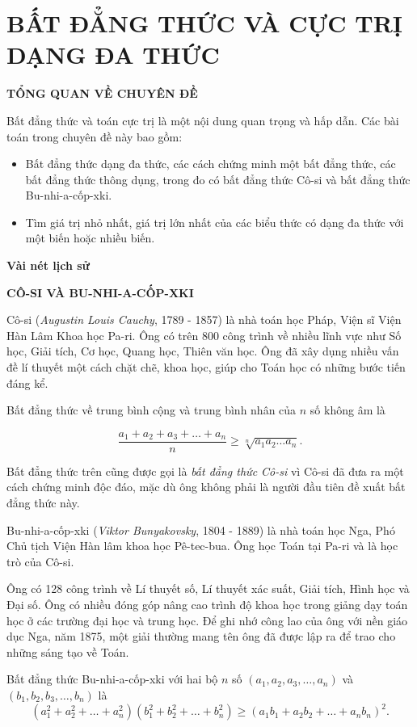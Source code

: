 
\section{BẤT ĐẲNG THỨC VÀ CỰC TRỊ DẠNG ĐA THỨC}

\begin{center}
 \large \textbf{TỔNG QUAN VỀ CHUYÊN ĐỀ}
\end{center}
Bất đẳng thức và toán cực trị là một nội dung quan trọng và hấp dẫn. Các bài toán trong chuyên đề này bao gồm:
\begin{itemize}
	\item Bất đẳng thức dạng đa thức, các cách chứng minh một bất đẳng thức, các bất đẳng thức thông dụng, trong đo có bất đẳng thức Cô-si và bất đẳng thức Bu-nhi-a-cốp-xki.
	\item Tìm giá trị nhỏ nhất, giá trị lớn nhất của các biểu thức có dạng đa thức với một biến hoặc nhiều biến.
\end{itemize}
\textbf{Vài nét lịch sử}
\begin{center}
	\textbf{CÔ-SI VÀ BU-NHI-A-CỐP-XKI}
\end{center}
Cô-si (\textit{Augustin Louis Cauchy}, 1789 - 1857) là nhà toán học Pháp, Viện sĩ Viện Hàn Lâm  Khoa học Pa-ri. Ông có trên 800 công trình về nhiều lĩnh vực như Số học, Giải tích, Cơ học, Quang học, Thiên văn học. Ông đã xây dụng nhiều vấn đề lí thuyết một cách chặt chẽ, khoa học, giúp cho Toán học có những bước tiến đáng kể.\medskip

Bất đẳng thức về trung bình cộng và trung bình nhân của $n$ số không âm là 

$$\dfrac{a_1+a_2+a_3+\ldots+a_n}{n}\geq\sqrt[n]{a_1a_2\ldots a_n}.$$

Bất đẳng thức trên cũng được gọi là \textit{bất đẳng thức Cô-si} vì Cô-si đã đưa ra một cách chứng minh độc đáo, mặc dù ông không phải là người đầu tiên đề xuất bất đẳng thức này.\medskip

Bu-nhi-a-cốp-xki (\textit{Viktor Bunyakovsky}, 1804 - 1889) là nhà toán học Nga, Phó Chủ tịch Viện Hàn lâm khoa học Pê-tec-bua. Ông học Toán tại Pa-ri và là học trò của Cô-si.\medskip

Ông có 128 công trình về Lí thuyết số, Lí thuyết xác suất, Giải tích, Hình học và Đại số. Ông có nhiều đóng góp nâng cao trình độ khoa học trong giảng dạy toán học ở các trường đại học và trung học. Để ghi nhớ công lao của ông với nền giáo dục Nga, năm 1875, một giải thường mang tên ông đã được lập ra để trao cho những sáng tạo về Toán.\medskip

Bất đẳng thức Bu-nhi-a-cốp-xki với hai bộ $n$ số $(a_1,a_2,a_3,\ldots,a_n)$ và $(b_1,b_2,b_3,\ldots,b_n)$ là $$(a_1^2+a_2^2+\ldots+a_n^2)(b_1^2+b_2^2+\ldots+b_n^2)\geq(a_1b_1+a_2b_2+\ldots+a_nb_n)^2.$$

